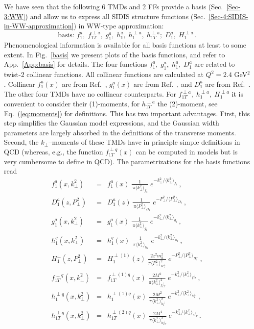 \documentclass[a4paper,11pt]{article}
\newcommand{\be}{\begin{equation}}
\newcommand{\ee}{\end{equation}}
\newcommand{\ba}{\begin{eqnarray}}
\newcommand{\ea}{\end{eqnarray}}
\newcommand{\la}{\langle}
\newcommand{\ra}{\rangle}
\def\kperp{k_\perp}
\def\pperp{P_\perp}
\def\avkperp{\la \kperp^2 \ra}
\def\avpperp{\la \pperp^2 \ra}
\begin{document}
We have seen that the following 6 TMDs and 2 FFs provide a basis 
(Sec.~\ref{Sec-3:WW}) and allow us to express all SIDIS structure 
functions (Sec.~\ref{Sec-4:SIDIS-in-WW-approximation})  
in WW-type approximation: 
\be\label{Eq:basis}
   \mbox{basis: \ \ } 
   f_1^a, \; f_{1T}^{\perp a}, \; g_1^a, \; h_1^a, \;h_1^{\perp a},\; h_{1T}^{\perp a};
   \; D_1^a, \; H_1^{\perp a} \, .
\ee
Phenomenological information is available for all basis functions at 
least to some extent. 
In Fig.~\ref{basis} we present plots of the basis functions, and refer
to App.~\ref{App:basis} for details.
The four functions $f_1^a, \; g_1^a, \; h_1^a,\; D_1^a$  are related to 
twist-2 collinear functions. All collinear functions are calculated at 
$Q^2 = 2.4$ GeV$^2$. Collinear $f_1^a(x)$ are from Ref.~\cite{Martin:2009iq},  
$g_1^a(x)$ are from Ref.~\cite{Gluck:1998xa}, and $D_1^a$ are from 
Ref.~\cite{deFlorian:2007aj}. The other four TMDs 
have no collinear counterparts. 
For $f_{1T}^{\perp a},\;h_1^{\perp a},\;H_1^{\perp a}$ it is convenient to 
consider their (1)-moments, for $ h_{1T}^{\perp a}$  the (2)-moment,
see Eq.~(\ref{eq:moments}) for definitions.
This has two important advantages. First, this step simplifies 
the Gaussian model expressions, and the Gaussian width parameters are
largely absorbed in the definitions of the transverse moments.
Second,
the $k_\perp$--moments of these TMDs have in principle simple definitions
in QCD (whereas, e.g., the function $f_{1T}^{\perp q}(x)$ can be computed in
models but is very cumbersome to define in QCD).
The parametrizations for the basis functions read
\begin{subequations}\ba
	f^a_1(x,\kperp^2) &=& f^a_1(x)\;
    	\frac{1}{\,\pi\avkperp_{f_1}}\;e^{-\kperp^2/\avkperp_{f_1}} \, ,
	\label{Eq:Gauss-f1}\\
    	D^a_1(z,\pperp^2) &=& D_1^a(z)\,
    	\frac{1}{\,\pi\avpperp_{D_1}}\;e^{-\pperp^2/\avpperp_{D_1}} \, ,
	\label{Eq:Gauss-D1}\\
	g^a_1(x,\kperp^2) &=& g^a_1(x)\;
    	\frac{1}{\,\pi\avkperp_{g_1}}\;e^{-\kperp^2/\avkperp_{g_1}} \, ,
	\label{Eq:Gauss-g1}\\
	h_{1}^{q} (x, \kperp^2) &=& h_{1}^{q} (x)\;
  	\frac{1}{\,\pi \avkperp_{h_1}}\;e^{-{\kperp^2}/{\avkperp_{h_1} }} \, ,
	\label{Eq:Gauss-h1}\\
	H_{1}^{\perp}(z,\pperp^2) &=&  H_{1}^{\perp (1)}(z) \;  
	\frac{2 z^2 m_h^2}{\pi \avpperp_{H_{1}^\perp}^2} \;
	e^{-\pperp^2/{\avpperp_{H_{1}^\perp}}}\, ,\\
	f_{1T}^{\perp q}(x,\kperp^2) &=&  f_{1T}^{\perp (1) q}(x)   \;
	\frac{2 M^2}{\pi \avkperp_{f_{1T}^\perp}^2} \;
	e^{-\kperp^2/{\avkperp_{f_{1T}^\perp}}} 
	\label{Eq:Gauss-f1Tperp}\, ,\\
	h_{1}^{\perp q}(x,\kperp^2) &=&  h_{1}^{\perp (1) q}(x)\;
   	\frac{2 M^2}{\pi \avkperp_{h_{1}^\perp}^2}\;
 	e^{-\kperp^2/{\avkperp_{h_{1}^\perp}}}\,
	\label{Eq:Gauss-h1perp}\, ,\\
	h_{1T}^{\perp q}(x,\kperp^2) &=&  h_{1T}^{\perp (2) q}(x)\;
   	\frac{2 M^4}{\pi \avkperp_{h_{1T}^\perp}^3} \;
	e^{-\kperp^2/{\avkperp_{h_{1T}^\perp}}}
	\label{Eq:Gauss-h1Tperp}\, .
\ea\end{subequations}
\end{document}
